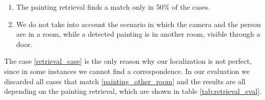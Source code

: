 \begin{enumerate}[label=\alph*)]
    \item \label{retrieval_case} The painting retrieval finds a match only in 50\% of the cases.
    \item \label{painting_other_room} We do not take into account the scenario in which the camera and the person are in a room, while a detected painting is in another room, visible through a door.
\end{enumerate}

The case \ref*{retrieval_case} is the only reason why our localization is not perfect, since in some instances we cannot find a correspondence. In our evaluation we discarded all cases that match \ref*{painting_other_room} and the results are all depending on the painting retrieval, which are shown in table \ref{tab:retrieval_eval}.
